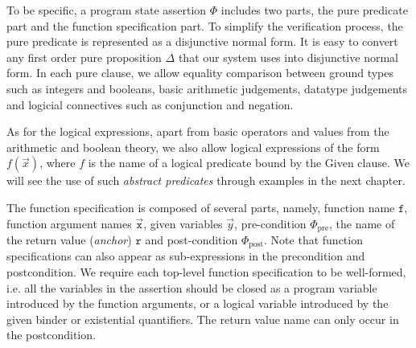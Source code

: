 To be specific, a program state assertion $\Phi$ includes two parts, 
the pure predicate part and the function specification part. 
To simplify the verification process, the pure predicate is represented as 
a disjunctive normal form. It is easy to convert any first order pure
proposition $\Delta$ that our system uses into disjunctive normal form. In each pure clause,
we allow equality comparison between ground types such as integers and booleans,
basic arithmetic judgements, datatype judgements and logicial connectives
such as conjunction and negation. 

As for the logical expressions, apart from basic operators and values from
the arithmetic and boolean theory, we also allow logical expressions of the form
$f(\vec{x})$, where $f$ is the name of a logical predicate bound
by the \textrm{Given} clause. We will see the use of such \emph{abstract predicates}
through examples in the next chapter.

The function specification is composed of several parts, namely, function name
$\texttt{f}$, function argument names $\vec{\texttt{x}}$, given variables $\vec{y}$, pre-condition $\Phi_{\text{pre}}$, the name of the return value (\emph{anchor}) $\texttt{r}$ and post-condition $\Phi_{\text{post}}$. Note that function specifications can also appear as sub-expressions in the precondition and postcondition. We require each top-level function specification to be 
well-formed, i.e. all the variables in the assertion should be closed as a
program variable introduced by the function arguments, or a
logical variable introduced by the given binder or existential quantifiers. The return value name can only occur in the postcondition.


